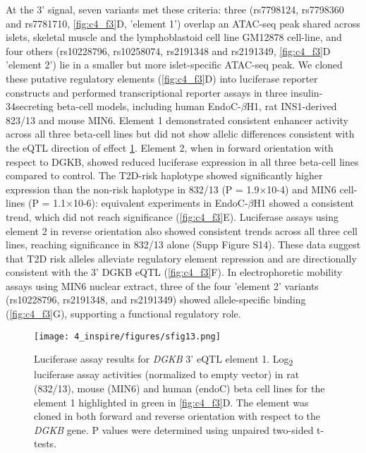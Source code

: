At the 3' signal, seven variants met these criteria: three (rs7798124, rs7798360 and rs7781710, \ref{fig:c4_f3}D, 'element 1') overlap an ATAC-seq peak shared across islets, skeletal muscle and the lymphoblastoid cell line GM12878 \cite{buenrostroTranspositionNativeChromatin2013} cell-line, and four others (rs10228796, rs10258074, rs2191348 and rs2191349, \ref{fig:c4_f3}D 'element 2') lie in a smaller but more islet-specific ATAC-seq peak. We cloned these putative regulatory elements (\ref{fig:c4_f3}D) into luciferase reporter constructs and performed transcriptional reporter assays in three insulin-34secreting beta-cell models, including human EndoC-$\beta$H1, rat INS1-derived 823/13 and mouse MIN6. Element 1 demonstrated consistent enhancer activity across all three beta-cell lines but did not show allelic differences consistent with the eQTL direction of effect \ref{fig:c4_sf13}. Element 2, when in forward orientation with respect to DGKB, showed reduced luciferase expression in all three beta-cell lines compared to control. The T2D-risk haplotype showed significantly higher expression than the non-risk haplotype in 832/13 (P = 1.9×10-4) and MIN6 cell-lines (P = 1.1×10-6): equivalent experiments in EndoC-$\beta$H1 showed a consistent trend, which did not reach significance (\ref{fig:c4_f3}E). Luciferase assays using element 2 in reverse orientation also showed consistent trends across all three cell lines, reaching significance in 832/13 alone (Supp Figure S14). These data suggest that T2D risk alleles alleviate regulatory element repression and are directionally consistent with the 3' DGKB eQTL (\ref{fig:c4_f3}F). In electrophoretic mobility assays using MIN6 nuclear extract, three of the four 'element 2' variants (rs10228796, rs2191348, and rs2191349) showed allele-specific binding (\ref{fig:c4_f3}G), supporting a functional regulatory role.

\begin{figure}
    \centering
    \texttt{[image: 4\_inspire/figures/sfig13.png]}
    \caption[Luciferase assay results for \textit{DGKB} 3' eQTL element 1]{Luciferase assay results for \textit{DGKB} 3' eQTL element 1. Log\textsubscript{2} luciferase assay activities (normalized to empty vector) in rat (832/13), mouse (MIN6) and human (endoC) beta cell lines for the element 1 highlighted in green in \ref{fig:c4_f3}D. The element was cloned in both forward and reverse orientation with respect to the \textit{DGKB} gene. P values were determined using unpaired two-sided t-tests.}
    \label{fig:c4_sf13}
\end{figure}


